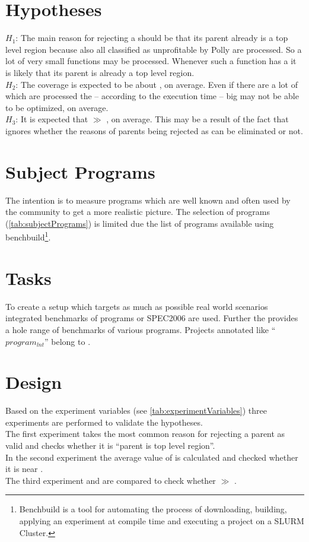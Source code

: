 \section{Hypotheses}
\(H_1\): The main reason for rejecting a \scop should be that its parent already is a top level region because also all \scops classified as unprofitable by Polly are processed.
So a lot of very small functions may be processed.
Whenever such a function has a \scop it is likely that its parent is already a top level region.\\
\(H_2\): The coverage \dyncovs is expected to be about \hTwoAbout, on average.
Even if there are a lot of \scops which are processed the -- according to the execution time -- big \scops may not be able to be optimized, on average.\\
\(H_3\): It is expected that \dyncovp \(\gg\) \dyncovs, on average.
This may be a result of the fact that \dyncovp ignores whether the reasons of parents being rejected as \scop can be eliminated or not.\\

\section{Subject Programs}
The intention is to measure programs which are well known and often used by the community to get a more realistic picture.
The selection of programs (\autoref{tab:subjectPrograms}) is limited due the list of programs available using benchbuild\footnote{Benchbuild is a tool for automating the process of downloading, building, applying an experiment at compile time and executing a project on a SLURM \cite{slurm} Cluster.}.

\section{Tasks}
\begin{sloppypar}
    To create a setup which targets as much as possible real world scenarios integrated benchmarks of programs or SPEC2006 are used.
    Further the \lnt provides a hole range of benchmarks of various programs.
    Projects annotated like \enquote{\(program_{lnt}\)} belong to \lnt.
\end{sloppypar}

\section{Design}
Based on the experiment variables (see \autoref{tab:experimentVariables}) three experiments are performed to validate the hypotheses.\\
The first experiment takes the most common reason for rejecting a parent as valid \scop and checks whether it is \enquote{parent is top level region}.\\
In the second experiment the average value of \dyncovs is calculated and checked whether it is near \hTwoAbout.\\
The third experiment \dyncovp and \dyncovs are compared to check whether \dyncovp \(\gg\) \dyncovs.

